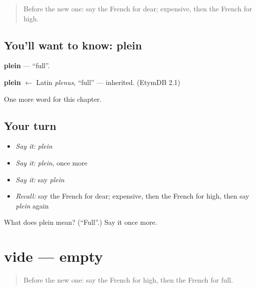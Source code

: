 \label{lesson:FR-C90-plein}



\begin{quote}
Before the new one: say the French for dear; expensive, then the French for high.
\end{quote}

\subsection*{You'll want to know: plein}
\textbf{plein} — \textquotedblleft{}full\textquotedblright{}.

\begin{cousinweb}
\textbf{plein} $\leftarrow$ Latin \emph{plenus}, \textquotedblleft{}full\textquotedblright{} — inherited. (EtymDB 2.1)
\end{cousinweb}

\begin{grammarlens}[title={What you've built}]
One more word for this chapter.
\end{grammarlens}

\subsection*{Your turn}
\begin{itemize}
\raggedright
  \item \emph{Say it:} \emph{plein}
  \item \emph{Say it:} \emph{plein}, once more
  \item \emph{Say it:} say \emph{plein}
  \item \emph{Recall:} say the French for dear; expensive, then the French for high, then say \emph{plein} again
\end{itemize}

\begin{tcolorbox}[breakable,colback=teal!4,colframe=teal!35!black,title={Before you move on}]
What does plein mean? (\textquotedblleft{}Full\textquotedblright{}.) Say it once more.
\end{tcolorbox}
\section[vide]{vide — empty}

\label{lesson:FR-C90-vide}



\begin{quote}
Before the new one: say the French for high, then the French for full.
\end{quote}

